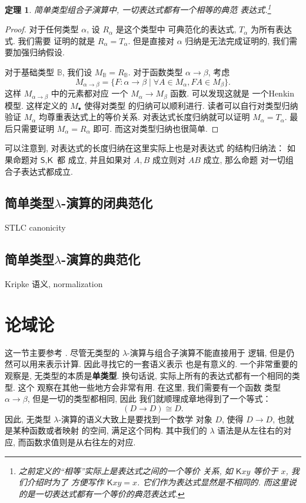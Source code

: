 \documentclass[UTF8]{ctexbook}
\newcommand{\cons}[1]{\textsf{#1}}
\theoremstyle{plain}
\newtheorem{theorem}{定理}[chapter]
\theoremstyle{definition}
\theoremstyle{remark}
\begin{document}
\begin{theorem}
简单类型组合子演算中, 一切表达式都有一个相等的典范
表达式.\footnote{之前定义的“相等”实际上是表达式之间的一个等价
关系, 如 \(\cons{K}xy\) 等价于 \(x\), 我们介绍时为了
方便写作 \(\cons{K}xy = x\). 它们作为表达式显然是不相同的.
而这里说的是一切表达式都有一个等价的典范表达式.}
\end{theorem}
\begin{proof}
对于任何类型 \(\alpha\), 设 \(R_\alpha\) 是这个类型中
可典范化的表达式, \(T_\alpha\) 为所有表达式. 我们需要
证明的就是 \(R_\alpha = T_\alpha\). 但是直接对 \(\alpha\)
归纳是无法完成证明的, 我们需要加强归纳假设.

对于基础类型 \(\mathbb B\), 我们设 \(M_{\mathbb B} = R_{\mathbb B}\).
对于函数类型 \(\alpha \to \beta\), 考虑
\[M_{\alpha \to \beta} = \{F : \alpha \to \beta \mid
\forall A \in M_\alpha, FA \in M_\beta\}.\]
这样 \(M_{\alpha \to \beta}\) 中的元素都对应
一个 \(M_\alpha \to M_\beta\) 函数. 可以发现这就是
一个Henkin模型. 这样定义的 \(M_\bullet\) 使得对类型
的归纳可以顺利进行. 读者可以自行对类型归纳验证 \(M_\alpha\)
均尊重表达式上的等价关系. 对表达式长度归纳就可以证明
\(M_\alpha = T_\alpha\). 最后只需要证明 \(M_\alpha = R_\alpha\)
即可. 而这对类型归纳也很简单.
\end{proof}

可以注意到, 对表达式的长度归纳在这里实际上也是对表达式
的结构归纳法： 如果命题对 \(\cons{S}, \cons{K}\) 都
成立, 并且如果对 \(A,B\) 成立则对 \(AB\) 成立, 那么命题
对一切组合子表达式都成立.

\subsection{简单类型\texorpdfstring{\(\lambda\)}{Lambda}-演算的闭典范化}
STLC canonicity

\subsection{简单类型\texorpdfstring{\(\lambda\)}{Lambda}-演算的典范化}
Kripke 语义, normalization

\section{论域论}\label{beginning:domain}

这一节主要参考 \cites{abramsky:1995:domain}{cartwright:2016:domain}.
尽管无类型的 \(\lambda\)-演算与组合子演算不能直接用于
逻辑, 但是仍然可以用来表示计算. 因此寻找它的一套语义表示
也是有意义的. 一个非常重要的观察是, 无类型的本质是\textbf{单类型}.
换句话说, 实际上所有的表达式都有一个相同的类型. 这个
观察在其他一些地方会非常有用. 在这里, 我们需要有一个函数
类型 \(\alpha \to \beta\), 但是一切的类型都相同, 因此
我们就顺理成章地得到了一个等式：
\[(D \to D) \cong D.\]
因此, 无类型 \(\lambda\)-演算的语义大致上是要找到一个数学
对象 \(D\), 使得 \(D \to D\), 也就是某种函数或者映射
的空间, 满足这个同构. 其中我们的 \(\lambda\)
语法是从左往右的对应, 而函数求值则是从右往左的对应.
\end{document}
